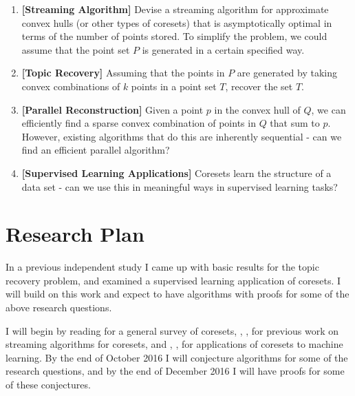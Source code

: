 \documentclass[12pt]{article}
\begin{document}
\begin{enumerate}
\item \textbf{[Streaming Algorithm]} Devise a streaming algorithm for approximate convex hulls (or other types of coresets) that is asymptotically optimal in terms of the number of points stored. To simplify the problem, we could assume that the point set $P$ is generated in a certain specified way.

\item \textbf{[Topic Recovery]} Assuming that the points in $P$ are generated by taking convex combinations of $k$ points in a point set $T$, recover the set $T$.

\item \textbf{[Parallel Reconstruction]} Given a point $p$ in the convex hull of $Q$, we can efficiently find a sparse convex combination of points in $Q$ that sum to $p$. However, existing algorithms that do this are inherently sequential - can we find an efficient parallel algorithm?

\item \textbf{[Supervised Learning Applications]} Coresets learn the structure of a data set - can we use this in meaningful ways in supervised learning tasks?

\end{enumerate}

\section{Research Plan}

In a previous independent study I came up with basic results for the topic recovery problem, and examined a supervised learning application of coresets. I will build on this work and expect to have algorithms with proofs for some of the above research questions.

I will begin by reading \cite{survey} for a general survey of coresets, \cite{Hershberger2008}, \cite{adaptivesampling}, \cite{Clarkson1993} for previous work on streaming algorithms for coresets, and \cite{cvms}, \cite{icml2015_bachem15}, \cite{Feldman} for applications of coresets to machine learning. By the end of October 2016 I will conjecture algorithms for some of the research questions, and by the end of December 2016 I will have proofs for some of these conjectures.






\end{document}
